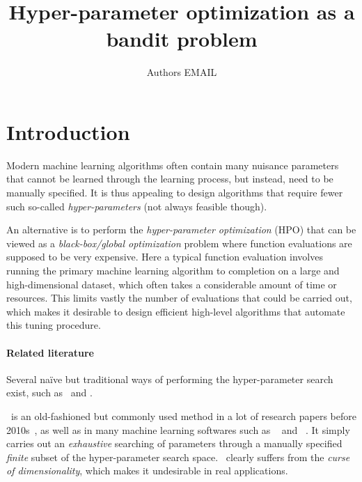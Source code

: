 \documentclass[twoside,11pt]{article}
\begin{document}
\title{\large Hyper-parameter optimization as a bandit problem}

\author{\name Authors \email EMAIL}


\maketitle


\begin{abstract}
	
\end{abstract}


\section{Introduction}

Modern machine learning algorithms often contain many nuisance parameters that cannot be learned through the learning process, but instead, need to be manually specified. It is thus appealing to design algorithms that require fewer such so-called \emph{hyper-parameters} (not always feasible though).

An alternative is to perform the \emph{hyper-parameter optimization} (HPO) that can be viewed as a \emph{black-box/global optimization} problem where function evaluations are supposed to be very expensive. Here a typical function evaluation involves running the primary machine learning algorithm to completion on a large and high-dimensional dataset, which often takes a considerable amount of time or resources. This limits vastly the number of evaluations that could be carried out, which makes it desirable to design efficient high-level algorithms that automate this tuning procedure.

\paragraph{Related literature}

Several naïve but traditional ways of performing the hyper-parameter search exist, such as \Grid\ and \Random.

\Grid\ is an old-fashioned but commonly used method in a lot of research papers before 2010s~\citep{lecun1998gradient}, as well as in many machine learning softwares such as \LIBSVM~\citep{chang2011libsvm} and \Scikit~\citep{pedregosa2011sklearn}. It simply carries out an \emph{exhaustive} searching of parameters through a manually specified \emph{finite} subset of the hyper-parameter search space. \Grid\ clearly suffers from the \emph{curse of dimensionality}, which makes it undesirable in real applications.
\end{document}
